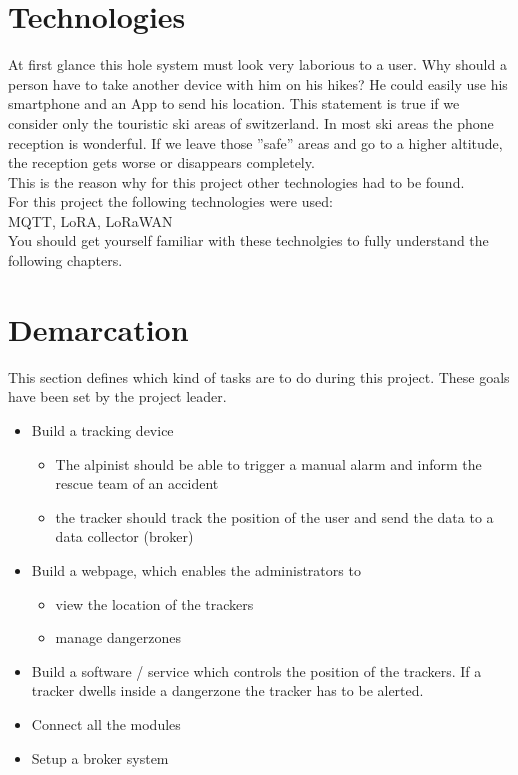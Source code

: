 \documentclass[a4paper,11pt, oneside]{report}
\theoremstyle{definition}
\begin{document}
\newpage

\section{Technologies}
At first glance this hole system must look very laborious  to a user. Why should a person have to take another device with him on his hikes? He could easily use his smartphone and an App to send his location. This statement is true if we consider only the touristic ski areas of switzerland. In most  ski areas the phone reception is wonderful. If we leave those ''safe'' areas and go to a higher altitude, the reception gets worse or disappears completely. \\[0.3cm]
This is the reason why for this project other technologies had to be found.\\[0.3cm]
For this project the following technologies were used:\\
MQTT, LoRA, LoRaWAN\\[0.3cm]
You should get yourself familiar with these technolgies to fully understand the following chapters.

\section{Demarcation}
This section defines which kind of tasks are to do during this project. These goals have been set by the project leader.
\begin{itemize}
\item Build a tracking device
	\begin{itemize}
		\item
			The alpinist should be able to trigger a manual alarm and inform the rescue team of an accident
		\item
			the tracker should track the position of the user and send the data to a data collector (broker)
	\end{itemize}
\item Build a webpage, which enables the administrators to
	\begin{itemize}
		\item
			view the location of the trackers
		\item
			manage dangerzones
	\end{itemize}
\item Build a software / service which controls the position of the trackers. If a tracker dwells inside a dangerzone the tracker has to be alerted.
\item Connect all the modules
\item Setup a broker system
\end{itemize}
\end{document}
